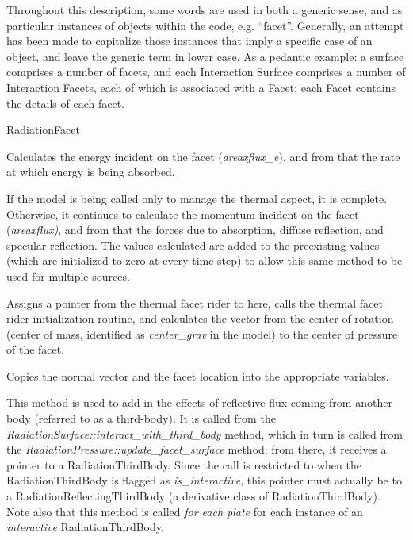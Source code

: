 Throughout this description, some words are used in both a generic sense, and as
particular instances of objects within the code, e.g. ``facet''.  Generally, an
attempt has been made to capitalize those instances that imply a specific case
of an object, and leave the generic term in lower case.  As a pedantic example:
a surface comprises a number of facets, and each Interaction Surface comprises a
number of Interaction Facets, each of which is associated with a Facet; each
 Facet contains the details of each
facet.

{\begin{enumerate}

 RadiationFacet

\begin{enumerate}

Calculates the energy incident on the facet (\textit{areaxflux\_e}), and from
 that the rate at which energy is being absorbed.

If the model is being called only to manage the thermal aspect, it is complete.
Otherwise, it continues to calculate the momentum incident on the facet
(\textit{areaxflux)}, and from that the forces due to absorption, diffuse
reflection, and specular reflection.  The values calculated are added to
the preexisting values (which are initialized to zero at every time-step)
to allow this same method to be used for multiple sources.

Assigns a pointer from the thermal facet rider to here, calls the thermal facet
rider initialization routine, and calculates the vector from the center of
rotation (center of mass, identified as \textit{center\_grav} in the model) to
the center of pressure of the facet.

Copies the normal vector and the facet location into the appropriate variables.

\label{method:FPinteractwiththirdbody}
This method is used to add in the effects of reflective flux coming from
another body (referred to as a third-body).  It is called from the
\textit{RadiationSurface::interact\_with\_third\_body} method, which in turn is
called from the \textit{RadiationPressure::update\_facet\_surface} method; from
there, it receives a pointer to a RadiationThirdBody.  Since the call is
restricted to when the RadiationThirdBody is flagged as
\textit{is\_interactive}, this pointer must actually be to a
RadiationReflectingThirdBody (a derivative class of RadiationThirdBody).  Note
also that this method is called \textit{for each plate} for each instance of an
\textit{interactive} RadiationThirdBody.


\end{enumerate}
\end{enumerate}}
